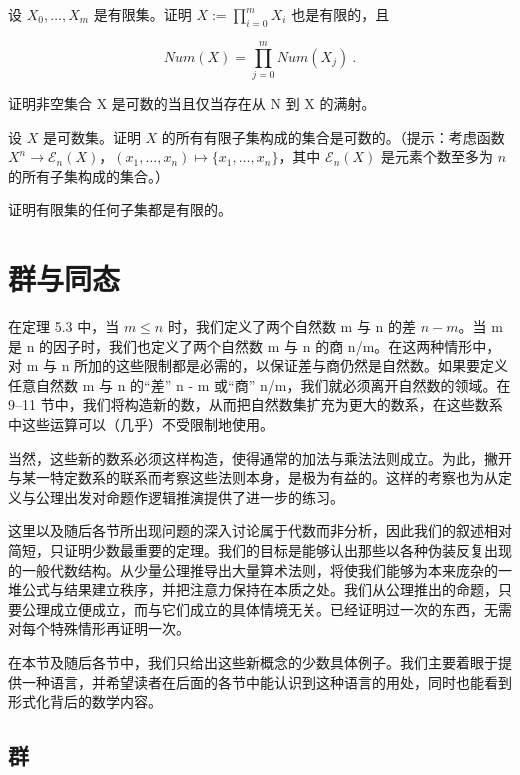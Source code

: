 \begin{exercises}
设 $ X_0, \ldots, X_m $ 是有限集。证明 $ X := \prod_{i=0}^{m} X_i $ 也是有限的，且

\[
Num(X)=\prod_{j=0}^{m}Num(X_{j})~.
\]
\item

证明非空集合 X 是可数的当且仅当存在从 N 到 X 的满射。

\item

设 $X$ 是可数集。证明 $X$ 的所有有限子集构成的集合是可数的。（提示：考虑函数 $X^n \to \mathcal{E}_n(X)$，$(x_1, \ldots, x_n) \mapsto \{x_1, \ldots, x_n\}$，其中 $\mathcal{E}_n(X)$ 是元素个数至多为 $n$ 的所有子集构成的集合。）

\item

证明有限集的任何子集都是有限的。

\end{exercises}

\section{群与同态}

在定理 5.3 中，当 $ m \leq n $ 时，我们定义了两个自然数 m 与 n 的差 $ n - m $。当 m 是 n 的因子时，我们也定义了两个自然数 m 与 n 的商 n/m。在这两种情形中，对 m 与 n 所加的这些限制都是必需的，以保证差与商仍然是自然数。如果要定义任意自然数 m 与 n 的“差” n - m 或“商” n/m，我们就必须离开自然数的领域。在 9–11 节中，我们将构造新的数，从而把自然数集扩充为更大的数系，在这些数系中这些运算可以（几乎）不受限制地使用。

当然，这些新的数系必须这样构造，使得通常的加法与乘法法则成立。为此，撇开与某一特定数系的联系而考察这些法则本身，是极为有益的。这样的考察也为从定义与公理出发对命题作逻辑推演提供了进一步的练习。

这里以及随后各节所出现问题的深入讨论属于代数而非分析，因此我们的叙述相对简短，只证明少数最重要的定理。我们的目标是能够认出那些以各种伪装反复出现的一般代数结构。从少量公理推导出大量算术法则，将使我们能够为本来庞杂的一堆公式与结果建立秩序，并把注意力保持在本质之处。我们从公理推出的命题，只要公理成立便成立，而与它们成立的具体情境无关。已经证明过一次的东西，无需对每个特殊情形再证明一次。

在本节及随后各节中，我们只给出这些新概念的少数具体例子。我们主要着眼于提供一种语言，并希望读者在后面的各节中能认识到这种语言的用处，同时也能看到形式化背后的数学内容。

\subsection*{群}

